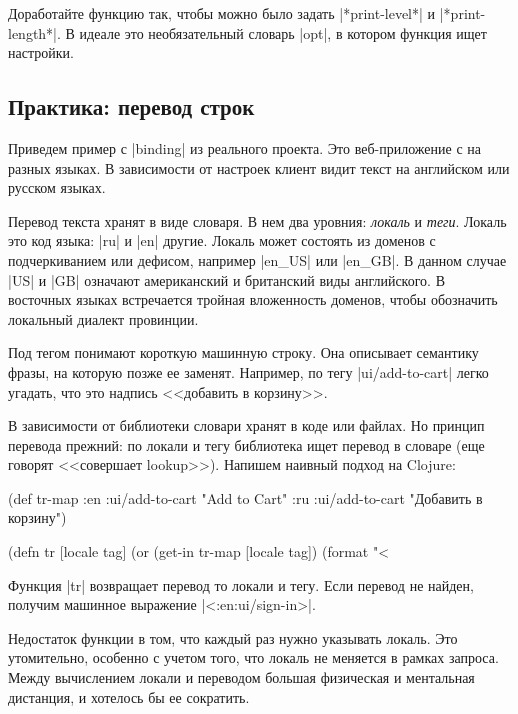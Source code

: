 Доработайте функцию так, чтобы можно было задать \spverb|*print-level*| и
\spverb|*print-length*|. В идеале это необязательный словарь \spverb|opt|, в
котором функция ищет настройки.

\subsection{Практика: перевод строк}

Приведем пример с \spverb|binding| из реального проекта. Это веб-приложение с на
разных языках. В зависимости от настроек клиент видит текст на английском или
русском языках.

Перевод текста хранят в виде словаря. В нем два уровния: \emph{локаль} и
\emph{теги}. Локаль это код языка: \spverb|ru| и \spverb|en| другие. Локаль
может состоять из доменов с подчеркиванием или дефисом, например \spverb|en_US|
или \spverb|en_GB|. В данном случае \spverb|US| и \spverb|GB| означают
американский и британский виды английского. В восточных языках встречается
тройная вложенность доменов, чтобы обозначить локальный диалект провинции.

Под тегом понимают короткую машинную строку. Она описывает семантику фразы, на
которую позже ее заменят. Например, по тегу \spverb|ui/add-to-cart| легко
угадать, что это надпись <<добавить в корзину>>.

В зависимости от библиотеки словари хранят в коде или файлах. Но принцип
перевода прежний: по локали и тегу библиотека ищет перевод в словаре (еще
говорят <<совершает lookup>>). Напишем наивный подход на Clojure:

  \begin{clojure}
(def tr-map
  {:en {:ui/add-to-cart "Add to Cart"}
   :ru {:ui/add-to-cart "Добавить в корзину"}})

(defn tr [locale tag]
  (or (get-in tr-map [locale tag])
      (format "<%
  \end{clojure}

Функция \spverb|tr| возвращает перевод то локали и тегу. Если перевод не найден,
получим машинное выражение \spverb|<:en:ui/sign-in>|.

Недостаток функции в том, что каждый раз нужно указывать локаль. Это
утомительно, особенно с учетом того, что локаль не меняется в рамках
запроса. Между вычислением локали и переводом большая физическая и ментальная
дистанция, и хотелось бы ее сократить.


